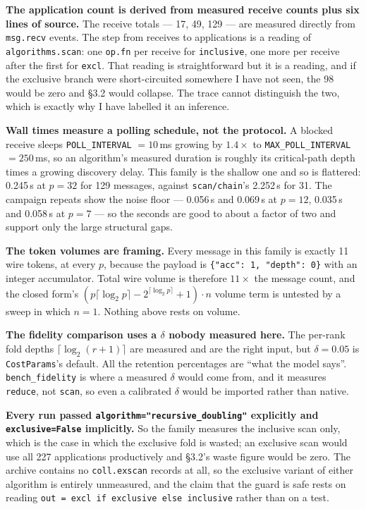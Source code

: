 \documentclass[11pt]{article}
\begin{document}
\textbf{The application count is derived from measured receive counts plus six lines of source.}
The receive totals --- 17, 49, 129 --- are measured directly from \texttt{msg.recv} events. The step
from receives to applications is a reading of \texttt{algorithms.scan}: one \texttt{op.fn} per
receive for \texttt{inclusive}, one more per receive after the first for \texttt{excl}. That
reading is straightforward but it is a reading, and if the exclusive branch were short-circuited
somewhere I have not seen, the 98 would be zero and \S3.2 would collapse. The trace cannot
distinguish the two, which is exactly why I have labelled it an inference.

\textbf{Wall times measure a polling schedule, not the protocol.} A blocked receive sleeps
\texttt{POLL\_INTERVAL} $= 10$\,ms growing by $1.4\times$ to \texttt{MAX\_POLL\_INTERVAL} $=
250$\,ms, so an algorithm's measured duration is roughly its critical-path depth times a growing
discovery delay. This family is the shallow one and so is flattered: 0.245\,s at $p=32$ for 129
messages, against \texttt{scan/chain}'s 2.252\,s for 31. The campaign repeats show the noise floor
--- 0.056\,s and 0.069\,s at $p=12$, 0.035\,s and 0.058\,s at $p=7$ --- so the seconds are good to
about a factor of two and support only the large structural gaps.

\textbf{The token volumes are framing.} Every message in this family is exactly 11 wire tokens, at
every $p$, because the payload is \texttt{\{"acc": 1, "depth": 0\}} with an integer accumulator.
Total wire volume is therefore $11 \times$ the message count, and the closed form's $(p\lceil\log_2
p\rceil - 2^{\lceil\log_2 p\rceil} + 1) \cdot n$ volume term is untested by a sweep in which
$n = 1$. Nothing above rests on volume.

\textbf{The fidelity comparison uses a $\delta$ nobody measured here.} The per-rank fold depths
$\lceil\log_2(r+1)\rceil$ are measured and are the right input, but $\delta = 0.05$ is
\texttt{CostParams}'s default. All the retention percentages are ``what the model says''.
\texttt{bench\_fidelity} is where a measured $\delta$ would come from, and it measures
\texttt{reduce}, not \texttt{scan}, so even a calibrated $\delta$ would be imported rather than
native.

\textbf{Every run passed \texttt{algorithm="recursive\_doubling"} explicitly and
\texttt{exclusive=False} implicitly.} So the family measures the inclusive scan only, which is the
case in which the exclusive fold is wasted; an exclusive scan would use all 227 applications
productively and \S3.2's waste figure would be zero. The archive contains no \texttt{coll.exscan}
records at all, so the exclusive variant of either algorithm is entirely unmeasured, and the claim
that the guard is safe rests on reading \texttt{out = excl if exclusive else inclusive} rather than
on a test.
\end{document}

